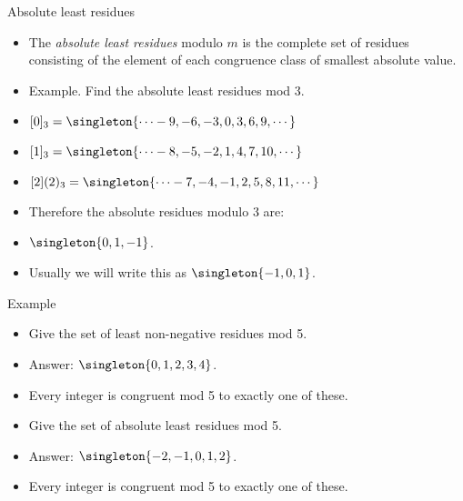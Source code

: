 \documentclass{beamer}
\begin{document}
\begin{frame}{Absolute least residues}

\begin{itemize}
  \item  The \emph{absolute least residues} modulo $m$ is the complete set of residues
  consisting of the element of each congruence class of smallest absolute value.
  \item Example. Find the absolute least residues mod $3$.
 \item $[0]_3 = \singleton{\cdots -9, -6, -3, 0, 3, 6, 9,\cdots}$
  \item $[1]_3 = \singleton{\cdots -8, -5, -2, 1, 4, 7, 10,\cdots}$
  \item $[2](2)_3 = \singleton{\cdots -7, -4, -1, 2, 5, 8, 11,\cdots}$
  \item Therefore the absolute residues modulo 3 are:
  \item $\singleton{0,1,-1}$.
  \item Usually we will write this as $\singleton{-1,0,1}$.
\end{itemize}

\end{frame}

\begin{frame}{Example}

\begin{itemize}
  \item  Give the set of least non-negative residues mod 5.
  \item Answer: $\singleton{0,1,2,3,4}$.
  \item Every integer is congruent mod 5 to exactly one of these.
  \item Give the set of absolute least residues mod 5.
  \item Answer: $\singleton{-2,-1,0,1,2}$.
  \item Every integer is congruent mod 5 to exactly one of these.
\end{itemize}

\end{frame}

\end{document}
